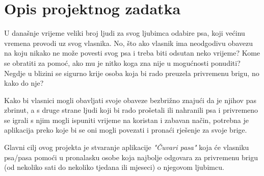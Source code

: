 \chapter{Opis projektnog zadatka}
		
		
		
		
		U današnje vrijeme veliki broj ljudi za svog ljubimca odabire psa, koji većinu vremena provodi uz svog vlasnika. No, što ako vlasnik ima neodgodivu obavezu na koju nikako ne može povesti svog psa i treba biti odsutan neko vrijeme? Kome se obratiti za pomoć, ako mu je nitko koga zna nije u mogućnosti ponuditi? Negdje u blizini se sigurno krije osoba koja bi rado preuzela privremenu brigu, no kako do nje? 
		
		Kako bi vlasnici mogli obavljati svoje obaveze bezbrižno znajući da je njihov pas zbrinut, a s druge strane ljudi koji bi rado prošetali ili nahranili psa i privremeno se igrali s njim mogli ispuniti vrijeme na koristan i zabavan način, potrebna je aplikacija preko koje bi se oni mogli povezati i pronaći rješenje za svoje brige. 
		
		Glavni cilj ovog projekta je stvaranje aplikacije \textit{"Čuvari pasa"} koja će vlasniku psa/pasa pomoći u pronalasku osobe koja najbolje odgovara za privremenu brigu (od nekoliko sati do nekoliko tjedana ili mjeseci) o njegovom ljubimcu. 
		
